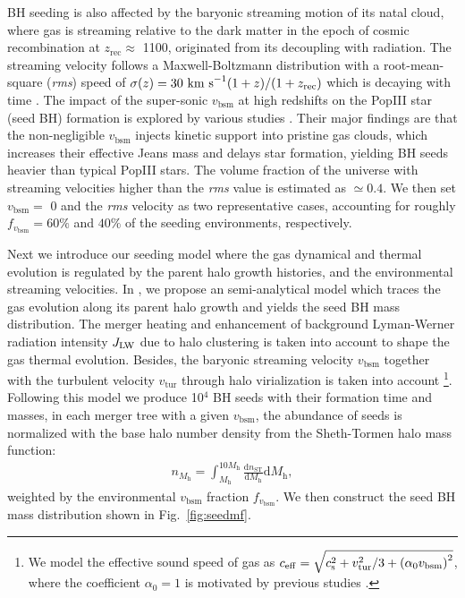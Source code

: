 \documentclass[nolinenumbers,preprint2,tighten]{aastex631}
\newcommand{\Mh}{M_\mathrm{h}}
\newcommand{\vbsm}{v_\mathrm{bsm}}
\newcommand{\jlw}{J_{\rm LW}}
\newcommand{\D}{\mathrm{d}}
\begin{document}
\begin{CJK*}{UTF8}{gbsn}
BH seeding is also affected by the baryonic streaming motion of its natal cloud, 
where gas is streaming relative to the dark matter in the epoch of cosmic recombination at $z_\mathrm{rec}\approx$ 1100, 
originated from its decoupling with radiation.
The streaming velocity follows a Maxwell-Boltzmann distribution with a root-mean-square (\textit{rms}) speed of 
$\sigma(z) = 30~{\rm km~s}^{-1} (1+z)/(1+z_{\mathrm{rec}})$ which is decaying with time \citep{2010PhRvD..82h3520T}.
The impact of the super-sonic $\vbsm$ at high redshifts on the PopIII star (seed BH) formation 
is explored by various studies \citep{2012MNRAS.424.1335F,2014MNRAS.439.1092T,2017Sci...357.1375H,2019MNRAS.484.3510S,2021ApJ...917...60L}.
Their major findings are that the non-negligible $\vbsm$ injects kinetic support into pristine gas clouds, 
which increases their effective Jeans mass and delays star formation, 
yielding BH seeds heavier than typical PopIII stars. 
The volume fraction of the universe with streaming velocities higher than the \textit{rms} value
is estimated as $\simeq 0.4$. We then set $\vbsm=$ 0 and the \textit{rms} velocity as two representative cases, 
accounting for roughly $f_{\vbsm} = 60\%$ and $40\%$ of the seeding environments, respectively. 

Next we introduce our seeding model where the gas dynamical and thermal evolution is regulated by the parent halo growth histories, 
and the environmental streaming velocities.
In \citet{2021ApJ...917...60L}, we propose an semi-analytical model which 
traces the gas evolution along its parent halo growth and yields the seed BH mass distribution. 
The merger heating and enhancement of background Lyman-Werner radiation intensity $\jlw$ 
due to halo clustering is taken into account to shape the gas thermal evolution. 
Besides, the baryonic streaming velocity $\vbsm$ together with the turbulent velocity $v_\mathrm{tur}$ 
through halo virialization is taken into account
\footnote{
We model the effective sound speed of gas as $c_{\rm eff} = \sqrt{ c_{\rm s}^2+v_{\rm tur}^2/3+\left(\alpha_0 \vbsm \right)^2}$,
where the coefficient $\alpha_0 = 1$ is motivated by previous studies 
\citep{2017Sci...357.1375H,2019MNRAS.484.3510S}.
}.
Following this model we produce 10$^4$ BH seeds with their formation time and masses, 
in each merger tree with a given $\vbsm$, 
the abundance of seeds is normalized with the base halo number density from the Sheth-Tormen \citep{2001MNRAS.323....1S} halo mass function:
\begin{align*}
  n_{\Mh}= \int_{\Mh}^{10\Mh}  \frac{\D n_{\mathrm{ST}}} {\D \Mh} \D \Mh, 
\end{align*}
weighted by the environmental $\vbsm$ fraction $f_{\vbsm}$. 
We then construct the seed BH mass distribution shown in Fig.~\ref{fig:seedmf}. 


\end{CJK*}
\end{document}
